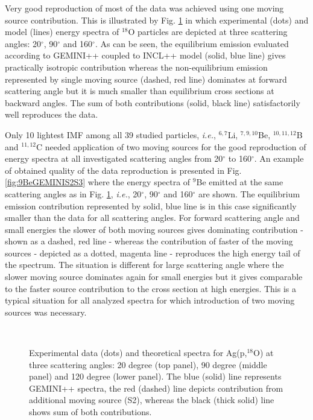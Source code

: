 Very good reproduction of most of the data was achieved using one
moving source contribution. %
This is illustrated by Fig. \ref{fig:18OGEMINIS2} in which
experimental (dots) and model (lines) energy spectra of $^{18}$O
particles are depicted at three scattering angles: 20$^{\circ}$,
90$^{\circ}$ and 160$^{\circ}$.  As can be seen, the equilibrium
emission evaluated according to GEMINI++ \cite{GEMINI++} coupled to
INCL++ \cite{Mancusi14A} model (solid, blue line) gives practically
isotropic contribution whereas the non-equilib\-rium emission
represented by single moving source (dashed, red line) dominates at
forward scattering angle but it is much smaller than equilibrium
cross sections at backward angles. The sum of both contributions
(solid, black line) satisfactorily well reproduces the data.

Only 10 lightest IMF among all 39 studied particles, \emph{i.e.},
$^{6,7}$Li, $^{7,9,10}$Be, $^{10,11,12}$B and $^{11,12}$C needed
application of two moving sources for the good reproduction of
energy spectra at all investigated scattering angles from
20$^{\circ}$ to 160$^{\circ}$.  An example of obtained quality of
the data reproduction is presented in Fig. \ref{fig:9BeGEMINIS2S3}
where the energy spectra of $^9$Be emitted at the same scattering
angles as in Fig. \ref{fig:18OGEMINIS2}, \emph{i.e.},  20$^{\circ}$,
90$^{\circ}$ and 160$^{\circ}$ are shown.  The equilibrium emission
contribution represented by solid, blue line is in this case
significantly smaller than the data for all scattering angles. For
forward scattering angle and small energies the slower of both
moving sources gives dominating contribution - shown as a dashed,
red line - whereas the contribution of faster of the moving sources
- depicted as a dotted, magenta line - reproduces the high energy
tail of the spectrum.  The situation is different for large
scattering angle where the slower moving source dominates again for
small energies but it gives comparable to the faster source
contribution to the cross section at high energies.  This is a
typical situation for all analyzed spectra for which introduction of
two moving sources was necessary.
%
%
\begin{figure}
  \centering
  \\
  \caption{Experimental data (dots) and theoretical spectra for Ag(p,$^{18}$O) at three
  scattering angles: 20 degree (top panel), 90 degree (middle panel) and 120 degree (lower panel).
  The blue (solid) line represents GEMINI++ spectra, the red (dashed) line depicts contribution
  from additional moving source (S2), whereas the black (thick solid) line shows sum of both contributions.}
  \label{fig:18OGEMINIS2}
\end{figure}
%

